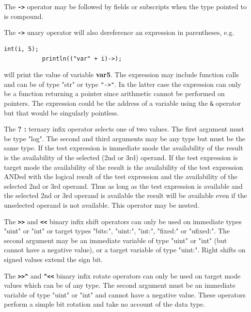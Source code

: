         The {\bf \verb'->'} operator may be followed by fields or
        subscripts when the type pointed to is compound.

        The {\bf \verb'->'} unary operator will also dereference an expression
        in parentheses, e.g.
        \begin{lstlisting}[gobble=8, language=threepl]
           int(i, 5);
           println(("var" + i)->);
        \end{lstlisting}
        will print the value of variable {\bf var5}. The expression may include
        function calls and can be of type "str" or type \verb'"->"'. In the latter
        case the expression can only be a function returning a pointer since
        arithmetic cannot be performed on pointers. The expression could be
        the address of a variable using the \verb'&' operator but that would
        be singularly pointless.

        The {\bf? :} ternary infix operator selects one of two values. The first
        argument must be type "log". The second and third arguments may be any type
        but must be the same type. If the test expression is immediate mode the
        availability of the result is the availability of the selected (2nd or 3rd)
        operand. If the test expression is target mode the availability of the
        result is the availability of the test expression ANDed with the logical
        result of the test expression and the availability of the selected 2nd or
        3rd operand. Thus as long as the test expression is available and the
        selected 2nd or 3rd operand is available the result will be available even
        if the unselected operand is not available. This operator may be nested.

        The {\bf\verb'>>'} and {\bf\verb'<<'} binary infix shift operators can
        only be used on immediate types "uint" or "int" or target types "bits:",
        "uint:", "int:", "fixed:" or "ufixed:". The second argument may be an
        immediate variable of type "uint" or "int" (but cannot have a negative
        value), or a target variable of type "uint:". Right shifts on signed
        values extend the sign bit.

        The {\bf\verb'>>^'} and {\bf\verb'^<<'} binary infix rotate operators
        can only be used on target mode values which can be of any type. The
        second argument must be an immediate variable of type "uint" or "int"
        and cannot have a negative value. These operators perform a simple
        bit rotation and take no account of the data type.
        

